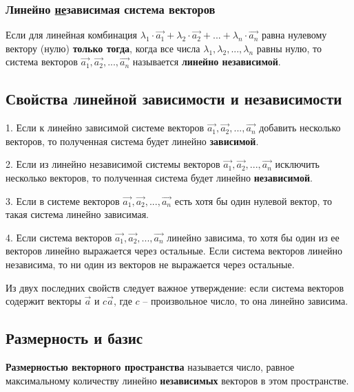 \documentclass[a4paper,12pt]{extbook}
\theoremstyle{named}
\theoremstyle{named}
\begin{document}
\subsubsection*{Линейно \underline{не}зависимая система векторов}
Если для линейная комбинация \(\lambda_1 \cdot \overrightarrow{a_1} + \lambda_2 \cdot \overrightarrow{a_2} + ... + \lambda_n \cdot \overrightarrow{a_n}\) равна нулевому вектору (нулю) \textbf{только тогда}, когда все числа \(\lambda_1, \lambda_2, ..., \lambda_n\) равны нулю, то система векторов \(\overrightarrow{a_1}, \overrightarrow{a_2}, ..., \overrightarrow{a_n}\) называется \textbf{линейно независимой}.

\subsection*{Свойства линейной зависимости и независимости}

1. Если к линейно зависимой системе векторов \(\overrightarrow{a_1}, \overrightarrow{a_2}, ..., \overrightarrow{a_n}\) добавить несколько векторов, то полученная система будет линейно \textbf{зависимой}.

2. Если из линейно независимой системы векторов \(\overrightarrow{a_1}, \overrightarrow{a_2}, ..., \overrightarrow{a_n}\) исключить несколько векторов, то полученная система будет линейно \textbf{независимой}.

3. Если в системе векторов \(\overrightarrow{a_1}, \overrightarrow{a_2}, ..., \overrightarrow{a_n}\) есть хотя бы один нулевой вектор, то такая система линейно зависимая.

4. Если система векторов \(\overrightarrow{a_1}, \overrightarrow{a_2}, ..., \overrightarrow{a_n}\) линейно зависима, то хотя бы один из ее векторов линейно выражается через остальные. Если система векторов линейно независима, то ни один из векторов не выражается через остальные.

Из двух последних свойств следует важное утверждение:
если система векторов содержит векторы \(\overrightarrow{a}\) и \(c \overrightarrow{a}\), где \(c\) – произвольное число, то она линейно зависима.

\subsection*{Размерность и базис}
\textbf{Размерностью векторного пространства} называется число, равное максимальному количеству линейно \textbf{независимых} векторов в этом пространстве.
\end{document}
